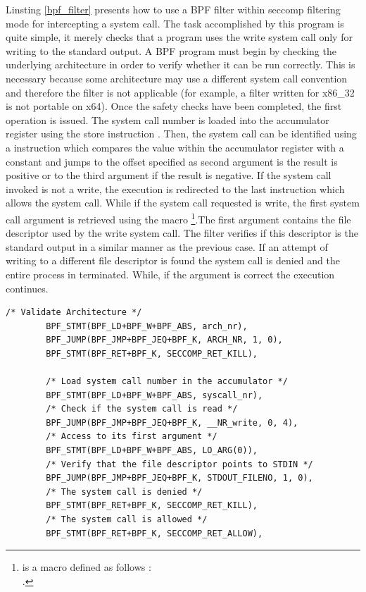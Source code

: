Linsting \ref{bpf_filter} presents how to use a BPF filter within seccomp filtering mode for intercepting a system call. The task accomplished by this program is quite simple, it merely checks that a program uses the write system call only for writing to the standard output. A BPF program must begin by checking the underlying architecture in order to verify whether it can be run correctly. This is necessary because some architecture may use a different system call convention and therefore the filter is not applicable (for example, a filter written for x86\_32 is not portable on x64). Once the safety checks have been completed, the first operation is issued. The system call number is loaded into the accumulator register using the store instruction . Then, the system call can be identified using a  instruction which compares the value within the accumulator register with a constant and jumps to the offset specified as second argument is the result is positive or to the third argument if the result is negative. If the system call invoked is not a write, the execution is redirected  to the last instruction which allows the system call. While if the system call requested is write, the first system call argument is retrieved using the macro \footnote{ is a macro defined as follows : \\
.
}.The first argument contains the file descriptor used by the write system call.  The filter verifies if this descriptor is the standard output in a similar manner as the previous case. If an attempt of writing to a different file descriptor is found the system call is denied and the entire process in terminated. While, if the argument is correct the execution continues.   

\begin{center}
\lstset{escapechar=@,style=c_num}
\begin{lstlisting}[label=bpf_filter,caption={BPF filter ensuring that a program can write only over the standard output}]
		/* Validate Architecture */
		BPF_STMT(BPF_LD+BPF_W+BPF_ABS, arch_nr), 
		BPF_JUMP(BPF_JMP+BPF_JEQ+BPF_K, ARCH_NR, 1, 0), 
		BPF_STMT(BPF_RET+BPF_K, SECCOMP_RET_KILL), 
		
		/* Load system call number in the accumulator */
		BPF_STMT(BPF_LD+BPF_W+BPF_ABS, syscall_nr),
		/* Check if the system call is read */
		BPF_JUMP(BPF_JMP+BPF_JEQ+BPF_K, __NR_write, 0, 4),
		/* Access to its first argument */
		BPF_STMT(BPF_LD+BPF_W+BPF_ABS, LO_ARG(0)),
		/* Verify that the file descriptor points to STDIN */
		BPF_JUMP(BPF_JMP+BPF_JEQ+BPF_K, STDOUT_FILENO, 1, 0),
		/* The system call is denied */
		BPF_STMT(BPF_RET+BPF_K, SECCOMP_RET_KILL),
		/* The system call is allowed */
		BPF_STMT(BPF_RET+BPF_K, SECCOMP_RET_ALLOW),

\end{lstlisting}
\end{center}

